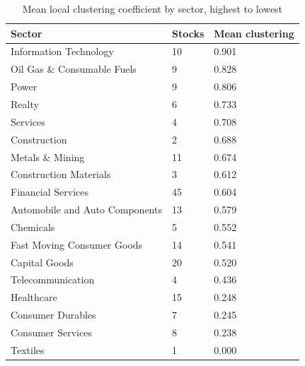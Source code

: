 \begin{table}[!ht]
\centering
\caption{Mean local clustering coefficient by sector, highest to lowest}
\label{tab:clustering-sector}
\begin{tabular}{lll}
\toprule
Sector & Stocks & Mean clustering \\
\midrule
Information Technology & 10 & 0.901 \\
Oil Gas \& Consumable Fuels & 9 & 0.828 \\
Power & 9 & 0.806 \\
Realty & 6 & 0.733 \\
Services & 4 & 0.708 \\
Construction & 2 & 0.688 \\
Metals \& Mining & 11 & 0.674 \\
Construction Materials & 3 & 0.612 \\
Financial Services & 45 & 0.604 \\
Automobile and Auto Components & 13 & 0.579 \\
Chemicals & 5 & 0.552 \\
Fast Moving Consumer Goods & 14 & 0.541 \\
Capital Goods & 20 & 0.520 \\
Telecommunication & 4 & 0.436 \\
Healthcare & 15 & 0.248 \\
Consumer Durables & 7 & 0.245 \\
Consumer Services & 8 & 0.238 \\
Textiles & 1 & 0.000 \\
\bottomrule
\end{tabular}
\end{table}
